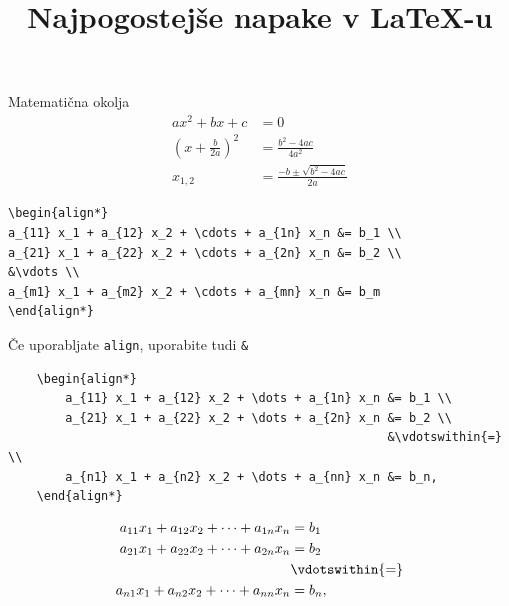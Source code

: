 \documentclass{beamer}
\title{Najpogostejše napake v \LaTeX-u}
\date{}
\begin{document}
\frame{\titlepage}

\begin{frame}[fragile]{Matematična okolja}
  \begin{align*}
	a x^2 + b x + c &= 0 \\
	\left(x + \frac{b}{2a}\right)^2 &= \frac{b^2-4ac}{4a^2} \\
	x_{1, 2} &= \frac{-b \pm \sqrt{b^2-4ac}}{2a}
  \end{align*}

  \begin{verbatim}
\begin{align*}
a_{11} x_1 + a_{12} x_2 + \cdots + a_{1n} x_n &= b_1 \\
a_{21} x_1 + a_{22} x_2 + \cdots + a_{2n} x_n &= b_2 \\
&\vdots \\
a_{m1} x_1 + a_{m2} x_2 + \cdots + a_{mn} x_n &= b_m
\end{align*}
  \end{verbatim}
\end{frame}

\begin{frame}[fragile]{Če uporabljate \texttt{align}, uporabite tudi \texttt{\&}}
    \begin{dobroenv}
    \begin{verbatim}
    \begin{align*}
        a_{11} x_1 + a_{12} x_2 + \dots + a_{1n} x_n &= b_1 \\
        a_{21} x_1 + a_{22} x_2 + \dots + a_{2n} x_n &= b_2 \\
                                                     &\vdotswithin{=} \\
        a_{n1} x_1 + a_{n2} x_2 + \dots + a_{nn} x_n &= b_n,
    \end{align*}
    \end{verbatim}

    \begin{align*}
        a_{11} x_1 + a_{12} x_2 + \dots + a_{1n} x_n &= b_1 \\
        a_{21} x_1 + a_{22} x_2 + \dots + a_{2n} x_n &= b_2 \\
                                                     &\vdotswithin{=} \\
        a_{n1} x_1 + a_{n2} x_2 + \dots + a_{nn} x_n &= b_n,
    \end{align*}
    \end{dobroenv}
\end{frame}
\end{document}
